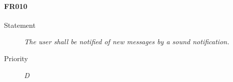\paragraph{FR010}
\begin{description}
  \item [Statement] 
  \textit{ The user shall be notified of new messages by a sound notification.}
\item [Priority] \textit{D}
\end{description}
